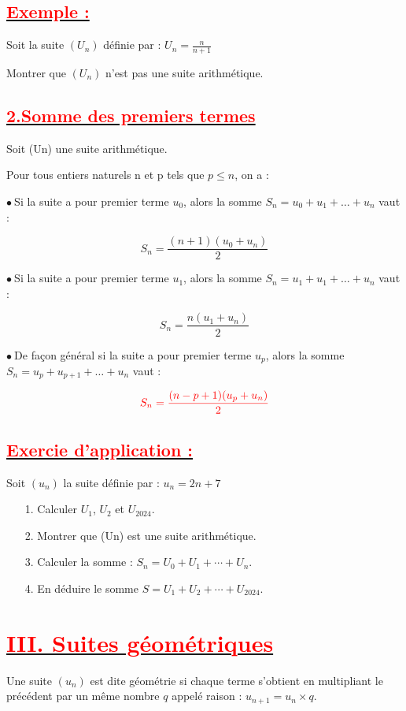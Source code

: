 \documentclass[12pt]{article}
\begin{document}
\subsection*{\underline{\textbf{\textcolor{red}{Exemple :}}}}
Soit la suite $(U_n)$ définie par : $U_{n}=\frac{n}{n+1}$

Montrer que $(U_n)$ n’est pas une suite arithmétique.
\subsection*{\underline{\textbf{\textcolor{red}{2.Somme des premiers termes}}}}	
Soit (Un) une suite arithmétique.

Pour tous entiers naturels n et p tels que $p \leq n$, on a :

$\bullet\ $Si la suite a pour premier terme $u_{0}$, alors la somme $S_{n}=u_{0}+u_{1}+\ldots+u_{n}$ vaut :
	
$$S_{n}=\dfrac{(n+1)\left(u_{0}+u_{n}\right)}{2}$$

$\bullet\ $Si la suite a pour premier terme $u_{1}$, alors la somme $S_{n}=u_{1}+u_{1}+\ldots+u_{n}$ vaut :

$$S_{n}=\dfrac{n(u_{1}+u_{n})}{2}$$

$\bullet\ $De façon général si la suite a pour premier terme $u_{p}$, alors la somme $S_{n}=u_{p}+u_{p+1}+\ldots+u_{n}$ vaut :

\begin{mdframed}[linecolor=red] %
    \[
    \color{red} S_{n}=\dfrac{(n-p+1)(u_{p}+u_{n})}{2}
    \]
\end{mdframed}
\subsection*{\underline{\textbf{\textcolor{red}{Exercie d'application :}}}}
Soit $\left(u_{n}\right)$ la suite définie par : $u_{n}=2n+7$
\begin{itemize}
\item[1.]Calculer $U_{1}$, $U_{2}$ et $U_{2024}.$
\item[2.] Montrer que (Un) est une suite arithmétique.
\item[3.] Calculer la somme : $S_{n} = U_{0} + U_{1} + \cdots+ U_{n}.$
\item[4.] En déduire le somme $S = U_{1} + U_{2} +\cdots+ U_{2024}.$
\end{itemize}
\section*{\underline{\textbf{\textcolor{red}{III. Suites géométriques}}}}
Une suite $\left(u_{n}\right)$ est dite géométrie si chaque terme s'obtient en multipliant le précédent par un même nombre $q$ appelé raison : $u_{n+1}=u_{n}\times q.$
\end{document}
